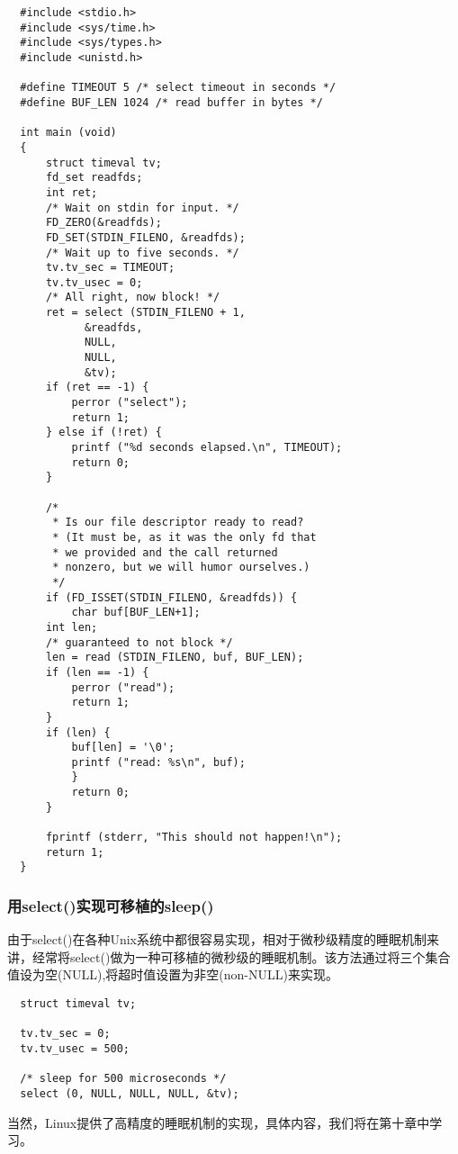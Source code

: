 \begin{lstlisting}
  #include <stdio.h>
  #include <sys/time.h>
  #include <sys/types.h>
  #include <unistd.h>

  #define TIMEOUT 5 /* select timeout in seconds */
  #define BUF_LEN 1024 /* read buffer in bytes */

  int main (void)
  {
      struct timeval tv;
      fd_set readfds;
      int ret;
      /* Wait on stdin for input. */
      FD_ZERO(&readfds);
      FD_SET(STDIN_FILENO, &readfds);
      /* Wait up to five seconds. */
      tv.tv_sec = TIMEOUT;
      tv.tv_usec = 0;
      /* All right, now block! */
      ret = select (STDIN_FILENO + 1,
		    &readfds,
		    NULL,
		    NULL,
		    &tv);
      if (ret == -1) {
          perror ("select");
          return 1;
      } else if (!ret) {
          printf ("%d seconds elapsed.\n", TIMEOUT);
          return 0;
      }

      /*
       * Is our file descriptor ready to read?
       * (It must be, as it was the only fd that
       * we provided and the call returned
       * nonzero, but we will humor ourselves.)
       */
      if (FD_ISSET(STDIN_FILENO, &readfds)) {
          char buf[BUF_LEN+1];
	  int len;
	  /* guaranteed to not block */
	  len = read (STDIN_FILENO, buf, BUF_LEN);
	  if (len == -1) {
	      perror ("read");
	      return 1;
	  }
	  if (len) {
	      buf[len] = '\0';
	      printf ("read: %s\n", buf);
          }
          return 0;
      }

      fprintf (stderr, "This should not happen!\n");
      return 1;
  }
\end{lstlisting}

\subsubsection{用select()实现可移植的sleep()}

由于select()在各种Unix系统中都很容易实现，相对于微秒级精度的睡眠机制来讲，经常将select()做为一种可移植的微秒级的睡眠机制。该方法通过将三个集合值设为空(NULL),将超时值设置为非空(non-NULL)来实现。 

\begin{lstlisting}
  struct timeval tv;

  tv.tv_sec = 0;
  tv.tv_usec = 500;

  /* sleep for 500 microseconds */
  select (0, NULL, NULL, NULL, &tv);
\end{lstlisting}

当然，Linux提供了高精度的睡眠机制的实现，具体内容，我们将在第十章中学习。

